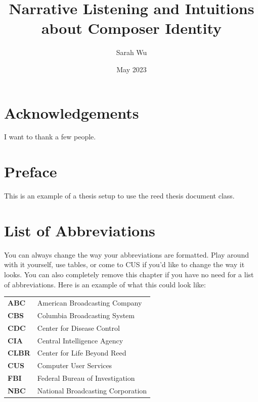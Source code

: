 \documentclass[12pt,twoside]{reedthesis}
\title{Narrative Listening and Intuitions about Composer Identity}
\author{Sarah Wu}
\date{May 2023}
\begin{document}
  \maketitle
  \frontmatter %
  \pagestyle{empty} %

    \chapter*{Acknowledgements}
	I want to thank a few people.

    \chapter*{Preface}
	This is an example of a thesis setup to use the reed thesis document class.
	
	

    \chapter*{List of Abbreviations}
		You can always change the way your abbreviations are formatted. Play around with it yourself, use tables, or come to CUS if you'd like to change the way it looks. You can also completely remove this chapter if you have no need for a list of abbreviations. Here is an example of what this could look like:

	\begin{table}[h]
	\centering %
	\begin{tabular}{ll}
		\textbf{ABC}  	&  American Broadcasting Company \\
		\textbf{CBS}  	&  Columbia Broadcasting System\\
		\textbf{CDC}  	&  Center for Disease Control \\
		\textbf{CIA}  	&  Central Intelligence Agency\\
		\textbf{CLBR} 	&  Center for Life Beyond Reed\\
		\textbf{CUS}  	&  Computer User Services\\
		\textbf{FBI}  	&  Federal Bureau of Investigation\\
		\textbf{NBC}  	&  National Broadcasting Corporation\\
	\end{tabular}
	\end{table}
	
\end{document}
